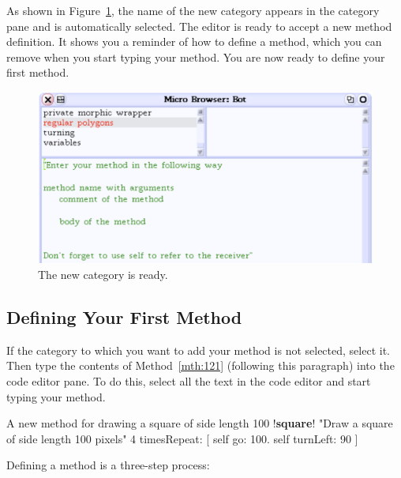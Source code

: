 \documentclass[a4paper,10pt,twoside]{book}
\begin{document}
As shown in Figure~\ref{fig:124}, the name of the new category appears in the category pane and 
is automatically selected. The editor is ready to accept a new method definition. It shows you 
a reminder of how to define a method, which you can remove when you start typing your 
method. You are now ready to define your first method. 

\begin{figure}[ht]
	\centerline{\includegraphics[width=0.85\linewidth]{tbFour}}
	\caption{The new category is ready. \label{fig:124}}
\end{figure}

\subsection{Defining Your First Method}

If the category to which you want to add your method is not selected, select it. Then type the 
contents of Method~\ref{mth:121} (following this paragraph) into the code editor pane. To do this, 
select all the text in the code editor and start typing your method. 

\begin{method}[121]{A new method for drawing a square of side length 100}
!\textbf{square}!
	"Draw a square of side length 100 pixels" 
	4 timesRepeat: 
		[ self go: 100. 
		self turnLeft: 90 ] 
\end{method}

Defining a method is a three-step process: 
\end{document}
